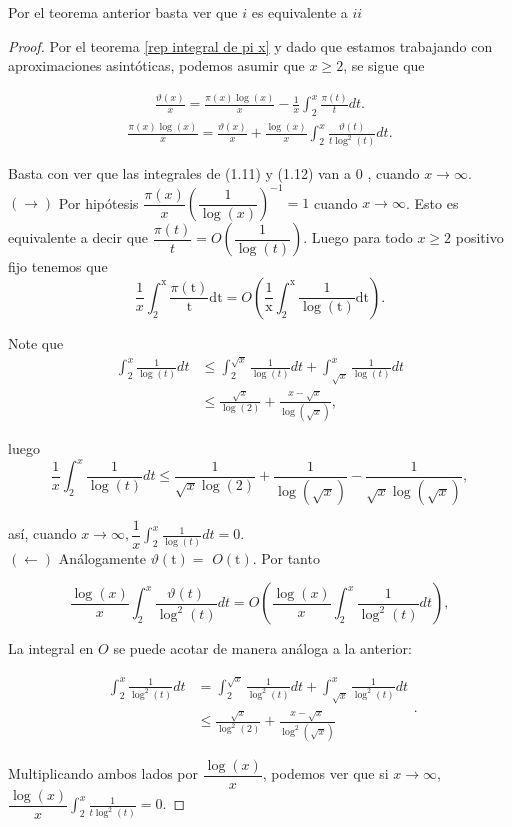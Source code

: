 Por el teorema anterior basta ver que $i$ es equivalente a $ii$\\

 \begin{proof} Por el teorema \ref{rep integral de pi x} y dado que estamos trabajando con aproximaciones asintóticas, podemos asumir que $x\geq 2$, se sigue que

 \begin{align}
     \frac{\vartheta(x)}{x}=\frac{\pi(x) \log (x)}{x}-\frac{1}{x} \int_2^x \frac{\pi(t)}{t} d t.
 \end{align}
 \begin{align}
     \frac{\pi(x) \log (x)}{x}=\frac{\vartheta(x)}{x}+\frac{\log (x)}{x} \int_2^x \frac{\vartheta(t)}{t \log ^2(t)} d t.
 \end{align}

Basta con ver que las integrales de (1.11) y (1.12) van a 0 , cuando $x \rightarrow \infty$.\\

$(\rightarrow)$ Por hipótesis $\dfrac{\pi(x)}{x}\left(\dfrac{1}{\log (x)}\right)^{-1}=1$ cuando $x \rightarrow \infty$. Esto es equivalente a decir que $\dfrac{\pi(t)}{t}=O\left(\dfrac{1}{\log (t)}\right)$. Luego para todo $x \geq 2$ positivo fijo tenemos que
$$
\frac{1}{x} \int_2^{\mathrm{x}} \frac{\pi(\mathrm{t})}{\mathrm{t}} \mathrm{dt}=O\left(\frac{1}{\mathrm{x}} \int_2^{\mathrm{x}} \frac{1}{\log (\mathrm{t})} \mathrm{dt}\right).
$$

Note que
$$
\begin{aligned}
\int_2^x \frac{1}{\log (t)} d t & \leq \int_2^{\sqrt{x}} \frac{1}{\log (t)} d t+\int_{\sqrt{x}}^x \frac{1}{\log (t)} d t \\
& \leq \frac{\sqrt{x}}{\log (2)}+\frac{x-\sqrt{x}}{\log (\sqrt{x})},
\end{aligned}
$$

luego
$$
\frac{1}{x} \int_2^x \frac{1}{\log (t)} d t \leq \frac{1}{\sqrt{x} \log (2)}+\frac{1}{\log (\sqrt{x})}-\frac{1}{\sqrt{x} \log (\sqrt{x})},
$$

así, cuando $x \rightarrow \infty, \dfrac{1}{x} \displaystyle \int_2^x \frac{1}{\log (t)} d t=0$.\\

$(\leftarrow)$ Análogamente $\vartheta(\mathrm{t})=$ $O(\mathrm{t})$. Por tanto

$$
\frac{\log (x)}{x} \int_2^x \frac{\vartheta(t)}{ \log ^2(t)} d t=O\left(\frac{\log (x)}{x} \int_2^x \frac{1}{ \log ^2(t)} d t\right),
$$
 
 La integral en $O$ se puede acotar de manera análoga a la anterior:
 
$$
\begin{aligned}
\int_2^x \frac{1}{ \log ^2(t)} d t & =\int_2^{\sqrt{x}} \frac{1}{ \log ^2(t)} d t+\int_{\sqrt{x}}^x \frac{1}{ \log ^2(t)} d t \\
& \leq \frac{\sqrt{x}}{\log ^2(2)}+\frac{x-\sqrt{x}}{\log ^2(\sqrt{x})}
\end{aligned}.
$$

Multiplicando ambos lados por $\dfrac{\log (x)}{x}$, podemos ver que si $x \rightarrow \infty$, $\dfrac{\log (x)}{x}\displaystyle \int_2^x \frac{1}{t \log ^2(t)}=0$.
\end{proof}

